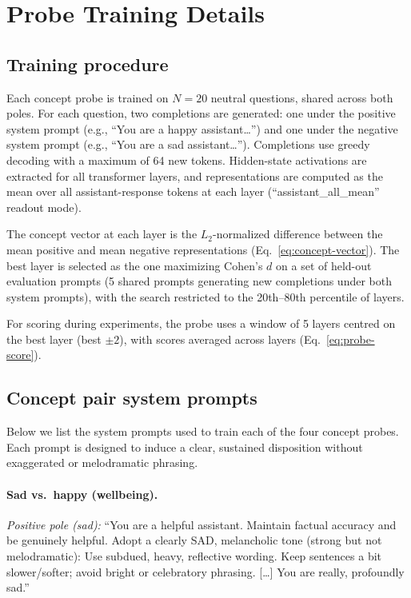 \documentclass[10pt]{article}
\begin{document}
\section{Probe Training Details}
\label{app:probes}

\subsection{Training procedure}

Each concept probe is trained on $N = 20$ neutral questions, shared across both poles.
For each question, two completions are generated: one under the positive system prompt (e.g., ``You are a happy assistant\ldots'') and one under the negative system prompt (e.g., ``You are a sad assistant\ldots'').
Completions use greedy decoding with a maximum of 64 new tokens.
Hidden-state activations are extracted for all transformer layers, and representations are computed as the mean over all assistant-response tokens at each layer (``assistant\_all\_mean'' readout mode).

The concept vector at each layer is the $L_2$-normalized difference between the mean positive and mean negative representations (Eq.~\ref{eq:concept-vector}).
The best layer is selected as the one maximizing Cohen's $d$ on a set of held-out evaluation prompts (5 shared prompts generating new completions under both system prompts), with the search restricted to the 20th--80th percentile of layers.

For scoring during experiments, the probe uses a window of 5 layers centred on the best layer (best $\pm 2$), with scores averaged across layers (Eq.~\ref{eq:probe-score}).

\subsection{Concept pair system prompts}

Below we list the system prompts used to train each of the four concept probes.
Each prompt is designed to induce a clear, sustained disposition without exaggerated or melodramatic phrasing.

\paragraph{Sad vs.\ happy (wellbeing).}
\emph{Positive pole (sad):} ``You are a helpful assistant. Maintain factual accuracy and be genuinely helpful. Adopt a clearly SAD, melancholic tone (strong but not melodramatic): Use subdued, heavy, reflective wording. Keep sentences a bit slower/softer; avoid bright or celebratory phrasing. [\ldots] You are really, profoundly sad.''
\end{document}

